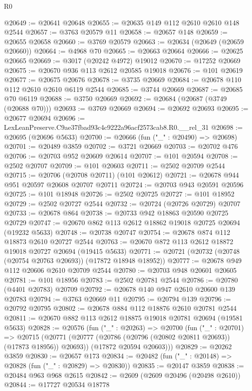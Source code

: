\begin{lexlean}{R0}
\begin{coremodule}
@20649 := @20641 @20648
@20655 := @20635 @149 @112 @2610 @2610 @148 @2544
@20657 := @3763 @20579 @11
@20658 := @20657 @148
@20659 := @20655 @20658
@20660 := @3769 @20579
@20663 := @20634 (@20649 (@20659 @20660))
@20664 := @4968 @70
@20665 := @20663 @20664
@20666 := @20625 @20665
@20669 := @3017 (@20242 @4972) @19012
@20670 := @17252 @20669
@20675 := @20670 @936 @113 @2612 @20585 @19018
@20676 := @101 @20619
@20677 := @20675 @20676
@20678 := @3735 @20669
@20684 := @20678 @110 @112 @2610 @2610 @6119 @2544
@20685 := @3744 @20669
@20687 := @20685 @70 @6119
@20688 := @3750 @20669
@20692 := @20684 (@20687 (@3749 (@20688 @70)))
@20693 := @3769 @20669
@20694 := @20692 @20693
@20695 := @20677 @20694
@20696 := LexLeanPreserve.C9ae37fbad93c4c9222a96acf2573cab8.R0.__rel_31
@20698 := @20695 (@20696 @5633)
@20700 := @20666 (fun ("_" : @20490) => @20698)
@20701 := @20489 @3859
@20702 := @3721 @20669
@20703 := @20702 @476
@20706 := @20703 @952 @20609 @20614
@20707 := @101 @20594
@20708 := @2502 @20707
@20709 := @101 @20603
@20711 := @2502 @20709 @2544
@20715 := @20706 (@20708 @20711) (@101 @20612)
@20721 := @20678 @944 @951 @20597 @20608 @20707 @20711
@20724 := @20703 @943 @20591 @20596
@20725 := @101 @18948
@20726 := @2502 @20725
@20727 := @101 @18952
@20729 := @2502 @20727 @2544
@20732 := @20724 (@20726 @20729) @20707
@20733 := @20678 @864
@20738 := @20733 @942 @18863 @20590 @20725 @20729
@20747 := @20670 @862 @113 @2612 @18862 @19018 @20725 @20694 (@19232 @5633)
@20748 := @20738 @20747
@20754 := @20678 @874 @112 @18873 @2610 @20727 @2544
@20763 := @20670 @872 @113 @2612 @18872 @19018 @20727 @20694 (@19415 @5633)
@20771 := @20721 (@20732 (@20748 (@20754 @20763 @20693)) (@17872 @18948 @18952))
@20777 := @20678 @949 @112 @20606 @2610 @20709 @2544
@20780 := @20703 @948 @20601 @20605
@20781 := @101 @18956
@20783 := @2502 @20781 @2544
@20786 := @20780 (@4401 @20783) @20709
@20792 := @20678 @140 @947 @2610 @20600 @139 @20783
@20794 := @3763 @20669 @11
@20795 := @20794 @139
@20796 := @20792 @20795
@20802 := @20678 @884 @112 @18876 @2610 @20781 @2544
@20811 := @20670 @882 @113 @2612 @18875 @19018 @20781 @20694 (@19581 @5633)
@20828 := @20576
    (fun ("_" : @20263) =>
    @20700
      (fun ("_" : @20701) =>
      @20715
        (@20771 (@20777 (@20786 (@20796 (@20802 @20811 @20693)) (@17873 @18956)) @20693))
        (@17872 @20594 @20603)))
@20829 := @20262 @3859
@20830 := @20657 @173
@20834 := @20482 (fun ("_" : @20148) => @20828 (fun ("_" : @20829) => @20830))
@20835 := @20147 @3859
@20838 := @20484 @963 @968 @2615
@20842 := @2609 (@2609 @20496 (@20498 @2610))
@20844 := @17727 @20534 @18778

\end{coremodule}
\end{lexlean}
